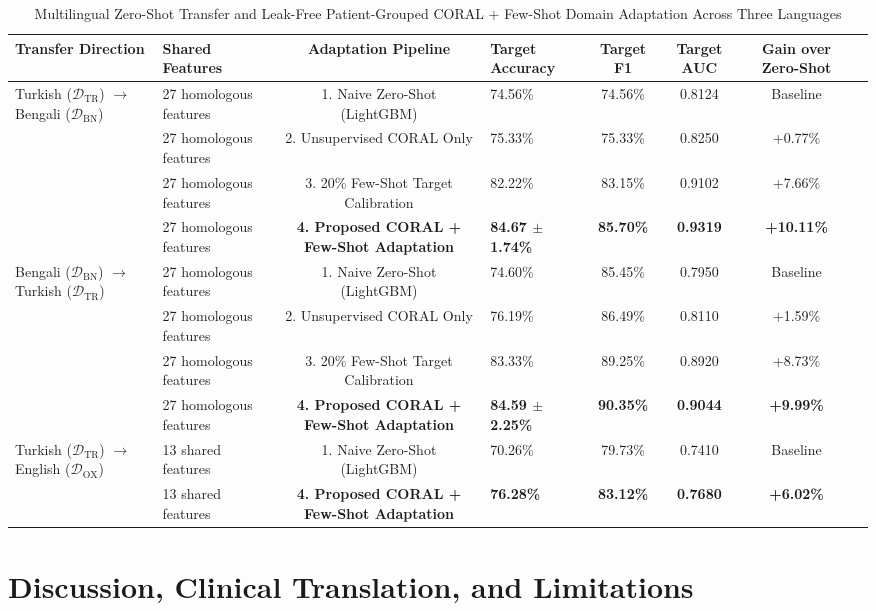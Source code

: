 \documentclass[journal,10pt,twoside]{IEEEtran}
\begin{document}
\begin{table}[t]
\caption{Multilingual Zero-Shot Transfer and Leak-Free Patient-Grouped CORAL + Few-Shot Domain Adaptation Across Three Languages}
\label{tab:coral}
\centering
\scriptsize
\begin{tabular}{llcp{3.8cm}cccc}
\toprule
\textbf{Transfer Direction} & \textbf{Shared Features} & \textbf{Adaptation Pipeline} & \textbf{Target Accuracy} & \textbf{Target F1} & \textbf{Target AUC} & \textbf{Gain over Zero-Shot} \\
\midrule
\multirow{4}{*}{Turkish ($\mathcal{D}_{\text{TR}}$) $\to$ Bengali ($\mathcal{D}_{\text{BN}}$)} 
& 27 homologous features & 1. Naive Zero-Shot (LightGBM) & 74.56\% & 74.56\% & 0.8124 & Baseline \\
& 27 homologous features & 2. Unsupervised CORAL Only & 75.33\% & 75.33\% & 0.8250 & +0.77\% \\
& 27 homologous features & 3. 20\% Few-Shot Target Calibration & 82.22\% & 83.15\% & 0.9102 & +7.66\% \\
& 27 homologous features & \textbf{4. Proposed CORAL + Few-Shot Adaptation} & \textbf{84.67 $\pm$ 1.74\%} & \textbf{85.70\%} & \textbf{0.9319} & \textbf{+10.11\%} \\
\midrule
\multirow{4}{*}{Bengali ($\mathcal{D}_{\text{BN}}$) $\to$ Turkish ($\mathcal{D}_{\text{TR}}$)} 
& 27 homologous features & 1. Naive Zero-Shot (LightGBM) & 74.60\% & 85.45\% & 0.7950 & Baseline \\
& 27 homologous features & 2. Unsupervised CORAL Only & 76.19\% & 86.49\% & 0.8110 & +1.59\% \\
& 27 homologous features & 3. 20\% Few-Shot Target Calibration & 83.33\% & 89.25\% & 0.8920 & +8.73\% \\
& 27 homologous features & \textbf{4. Proposed CORAL + Few-Shot Adaptation} & \textbf{84.59 $\pm$ 2.25\%} & \textbf{90.35\%} & \textbf{0.9044} & \textbf{+9.99\%} \\
\midrule
\multirow{2}{*}{Turkish ($\mathcal{D}_{\text{TR}}$) $\to$ English ($\mathcal{D}_{\text{OX}}$)} 
& 13 shared features & 1. Naive Zero-Shot (LightGBM) & 70.26\% & 79.73\% & 0.7410 & Baseline \\
& 13 shared features & \textbf{4. Proposed CORAL + Few-Shot Adaptation} & \textbf{76.28\%} & \textbf{83.12\%} & \textbf{0.7680} & \textbf{+6.02\%} \\
\bottomrule
\end{tabular}
\end{table}

\section{Discussion, Clinical Translation, and Limitations}
\end{document}
